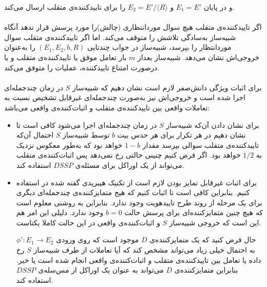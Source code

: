 \begin{itemize}
\begin{figure}[H]
\begin{center}
		
		\caption{}
		\label{fig:zkp_security_b1}
		
	\end{center}
\end{figure}
و در پایان 
$E_1 = E'$
و
$E_2 = E' / \langle R \rangle $
را برای تاییدکننده‌ی متقلب ارسال می‌کند.
\\
\\
اگر تاییدکننده‌ی متقلب هیچ سوال موردانتظاری (چالش)را مورد پرسش قرار ندهد آنگاه شبیه‌ساز به‌سادگی تلاشش را متوقف می‌کند. اما اگر تاییدکننده‌ی متقلب سوال موردانتظار را بپرسد، شبیه‌ساز در جواب چندتایی
$(E_1,E_2,b,R)$
را به‌عنوان خروجی‌اش نشان می‌دهد. شبیه‌ساز بعداز 
$m$
بار تعامل موفق یا تاییدکننده‌ی متقلب و یا درصورت امتناع تاییدکننده، عملیات را متوفق می‌کند.
\\
\\
برای اثبات ویژگی دانش‌صفر لازم است نشان دهیم که شبیه‌ساز
$S$
در زمان چندجمله‌ای اجرا شده است و خروجی‌اش نیز به‌صورت چندجمله‌ای غیرقابل تشخیص  نسبت به تعاملات واقعی بین تاییدکننده‌ی متقلب و اثبات‌کننده‌ی واقعی می‌باشد:
\begin{itemize}
\item {
	برای نشان دادن آن‌که شبیه‌ساز 
	$S$
	در زمان چندجمله‌ای اجرا می‌شود کافی است تا نشان دهیم در هر تکرار برای هر حدس بیت
	$b$
	توسط شبیه‌ساز
	$S$
	احتمال آن‌که تاییدکننده‌ی متقلب سوالی بپرسد مقدار
	$1-b$
	خواهد بود که به‌طور معکوس نزدیک به 
	$1/2$
	خواهد بود. اگر فرض کنیم چنینی حالتی رخ نمی‌دهد پس اثبات‌کننده‌ی متقلب می‌تواند از یک اوراکل برای مسئله‌ی 
	$DSSP$
	استفاده کند.
}

\item {
برای اثبات غیرقابل تمایز بودن لازم است از تکنیک هیبریدی گفته شده در
\cite{}
استفاده کنیم. بنابراین کافی است تا اثبات کنیم که هیج متمایزکننده‌ی چندجمله‌ای دیگری برای یک مرحله از روند طرح تاییدهویت وجود ندارد. بنابراین به روشنی معلوم است که هیچ چنین متمایزکننده‌ای برای پرسش حالت
$b=0$
وجود ندارد. دلیلی این امر هم این است که خروجی شبیه‌ساز 
$S$
و اثبات‌کننده‌ی واقعی در این حالت کاملا یکتاست.

حال فرض کنید که یک متمایزکننده‌ی 
$D$
موجود است که روی ورودی
${\phi}' : E_1 \rightarrow E_2$
به احتمال خیلی زیاد می‌تواند مشخص کند که آیا تعاملات از طرف شبیه‌ساز 
$S$
رخ داده یا تعامل بین تاییدکننده‌ی متقلب و اثبات‌کننده‌ی واقعی انجام شده است یا خیر. بنابراین متمایزکننده‌ی
$D$
می‌تواند به عنوان یک اوراکل از مس‌سله‌ی
$DSSP$
استفاده کند.

}
\end{itemize}

\end{itemize}~
\\
\\





